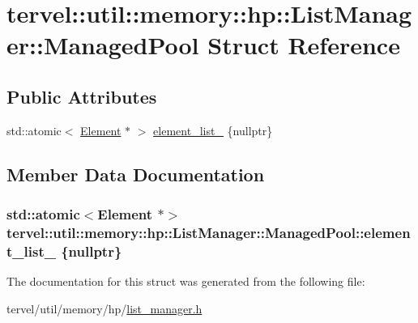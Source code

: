 \hypertarget{structtervel_1_1util_1_1memory_1_1hp_1_1_list_manager_1_1_managed_pool}{}\section{tervel\+:\+:util\+:\+:memory\+:\+:hp\+:\+:List\+Manager\+:\+:Managed\+Pool Struct Reference}
\label{structtervel_1_1util_1_1memory_1_1hp_1_1_list_manager_1_1_managed_pool}
\subsection*{Public Attributes}
\begin{DoxyCompactItemize}
\item 
std\+::atomic$<$ \hyperlink{classtervel_1_1util_1_1memory_1_1hp_1_1_element}{Element} $\ast$ $>$ \hyperlink{structtervel_1_1util_1_1memory_1_1hp_1_1_list_manager_1_1_managed_pool_a20d73e9d78c03f8e7ffb32a9cf258d8d}{element\+\_\+list\+\_\+} \{nullptr\}
\end{DoxyCompactItemize}


\subsection{Member Data Documentation}
\hypertarget{structtervel_1_1util_1_1memory_1_1hp_1_1_list_manager_1_1_managed_pool_a20d73e9d78c03f8e7ffb32a9cf258d8d}{}
\subsubsection[{element\+\_\+list\+\_\+}]{\setlength{\rightskip}{0pt plus 5cm}std\+::atomic$<${\bf Element} $\ast$$>$ tervel\+::util\+::memory\+::hp\+::\+List\+Manager\+::\+Managed\+Pool\+::element\+\_\+list\+\_\+ \{nullptr\}}\label{structtervel_1_1util_1_1memory_1_1hp_1_1_list_manager_1_1_managed_pool_a20d73e9d78c03f8e7ffb32a9cf258d8d}


The documentation for this struct was generated from the following file\+:\begin{DoxyCompactItemize}
\item 
tervel/util/memory/hp/\hyperlink{list__manager_8h}{list\+\_\+manager.\+h}\end{DoxyCompactItemize}
